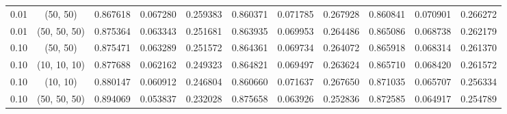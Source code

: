 \begin{table}[h!]
\begin{center}
{\begin{tabular}{ r | S |  S | S | S | S | S | S | S | S | S }
0.01 & {(50, 50)}                   & 0.867618        & 0.067280                     & 0.259383                      & 0.860371           & 0.071785                        & 0.267928                         & 0.860841       & 0.070901                    & 0.266272                     \\
0.01 & {(50, 50, 50)}               & 0.875364        & 0.063343                     & 0.251681                      & 0.863935           & 0.069953                        & 0.264486                         & 0.865086       & 0.068738                    & 0.262179                     \\
0.10 & {(50, 50)}                   & 0.875471        & 0.063289                     & 0.251572                      & 0.864361           & 0.069734                        & 0.264072                         & 0.865918       & 0.068314                    & 0.261370                     \\
0.10 & {(10, 10, 10)}               & 0.877688        & 0.062162                     & 0.249323                      & 0.864821           & 0.069497                        & 0.263624                         & 0.865710       & 0.068420                    & 0.261572                     \\
0.10 & {(10, 10)}                   & 0.880147        & 0.060912                     & 0.246804                      & 0.860660           & 0.071637                        & 0.267650                         & 0.871035       & 0.065707                    & 0.256334                     \\
0.10 & {(50, 50, 50)}               & 0.894069        & 0.053837                     & 0.232028                      & 0.875658           & 0.063926                        & 0.252836                         & 0.872585       & 0.064917                    & 0.254789      \\           
    \bottomrule %
    \end{tabular}
    }
    \end{center}
\end{table}